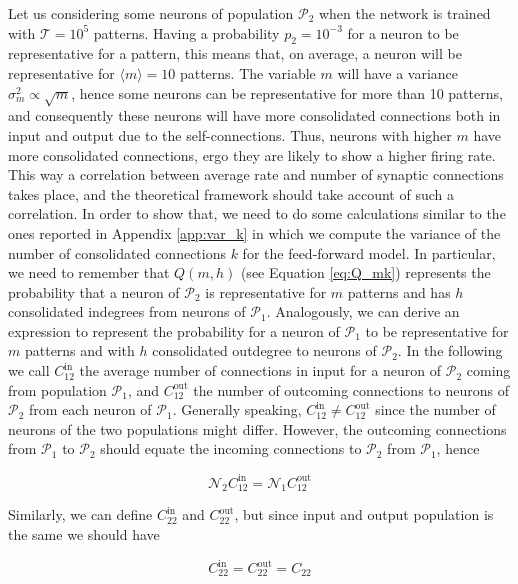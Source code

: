 \documentclass[a4paper, 12pt, twoside, openright]{book}
\newcommand{\popI}{\mathcal{P}_1}
\newcommand{\popII}{\mathcal{P}_2}
\newcommand{\NI}{\mathcal{N}_1}
\newcommand{\NII}{\mathcal{N}_2}
\newcommand{\T}{\mathcal{T}}
\begin{document}
Let us considering some neurons of population $\popII$ when the network is trained with $\T=10^5$ patterns. Having a probability $p_2= 10^{-3}$ for a neuron to be representative for a pattern, this means that, on average, a neuron will be representative for $\langle m \rangle = 10$ patterns. The variable $m$ will have a variance $\sigma^2_{m}\propto \sqrt{m}$, hence some neurons can be representative for more than 10 patterns, and consequently these neurons will have more consolidated connections both in input and output due to the self-connections. Thus, neurons with higher $m$ have more consolidated connections, ergo they are likely to show a higher firing rate. This way a correlation between average rate and number of synaptic connections takes place, and the theoretical framework should take account of such a correlation. In order to show that, we need to do some calculations similar to the ones reported in Appendix \ref{app:var_k} in which we compute the variance of the number of consolidated connections $k$ for the feed-forward model. In particular, we need to remember that $Q(m,h)$ (see Equation \eqref{eq:Q_mk}) represents the probability that a neuron of $\popII$ is representative for $m$ patterns and has $h$ consolidated indegrees from neurons of $\popI$. Analogously, we can derive an expression to represent the probability for a neuron of $\popI$ to be representative for $m$ patterns and with $h$ consolidated outdegree to neurons of $\popII$. 
In the following we call $C_{12}^\text{in}$ the average number of connections in input for a neuron of $\popII$ coming from population $\popI$, and $C_{12}^\text{out}$ the number of outcoming connections to neurons of $\popII$ from each neuron of $\popI$. Generally speaking, $C_{12}^\text{in} \neq C_{12}^\text{out}$ since the number of neurons of the two populations might differ. However, the outcoming connections from $\popI$ to $\popII$ should equate the incoming connections to $\popII$ from $\popI$, hence

\begin{equation}
\NII C_{12}^\text{in} = \NI C_{12}^\text{out}
\end{equation}

Similarly, we can define $C_{22}^\text{in}$ and $C_{22}^\text{out}$, but since input and output population is the same we should have

\begin{equation}
C_{22}^\text{in} = C_{22}^\text{out} = C_{22} 
\end{equation}
\end{document}
